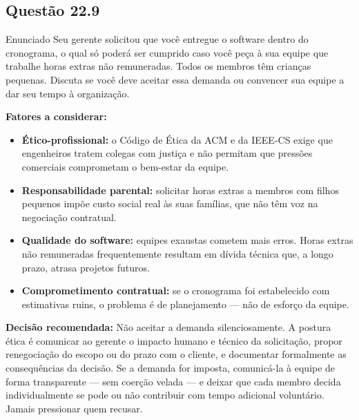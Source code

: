 \documentclass[12pt,a4paper]{article}
\begin{document}
\subsection*{Questão 22.9}
\begin{questao}{Enunciado}
Seu gerente solicitou que você entregue o software dentro do cronograma,
o qual só poderá ser cumprido caso você peça à sua equipe que trabalhe horas
extras não remuneradas. Todos os membros têm crianças pequenas. Discuta se
você deve aceitar essa demanda ou convencer sua equipe a dar seu tempo à
organização.
\end{questao}
\begin{resposta}
\textbf{Fatores a considerar:}

\begin{itemize}[nosep]
  \item \textbf{Ético-profissional:} o Código de Ética da ACM e da IEEE-CS
        exige que engenheiros tratem colegas com justiça e não permitam que
        pressões comerciais comprometam o bem-estar da equipe.
  \item \textbf{Responsabilidade parental:} solicitar horas extras a membros
        com filhos pequenos impõe custo social real às suas famílias, que não
        têm voz na negociação contratual.
  \item \textbf{Qualidade do software:} equipes exaustas cometem mais erros.
        Horas extras não remuneradas frequentemente resultam em dívida técnica
        que, a longo prazo, atrasa projetos futuros.
  \item \textbf{Comprometimento contratual:} se o cronograma foi estabelecido
        com estimativas ruins, o problema é de planejamento — não de
        esforço da equipe.
\end{itemize}

\textbf{Decisão recomendada:} Não aceitar a demanda silenciosamente. A postura
ética é comunicar ao gerente o impacto humano e técnico da solicitação,
propor renegociação do escopo ou do prazo com o cliente, e documentar
formalmente as consequências da decisão. Se a demanda for imposta,
comunicá-la à equipe de forma transparente — sem coerção velada — e deixar
que cada membro decida individualmente se pode ou não contribuir com tempo
adicional voluntário. Jamais pressionar quem recusar.
\end{resposta}

\end{document}
